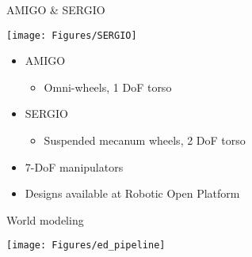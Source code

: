 \documentclass[a4paper,12pt]{article}
\newcommand{\emptylogo}{\texttt{[image: Figures/Empty]}}
\begin{document}
\begin{slidetop}
\begin{multicols}{2}
\begin{bclogo}[couleur = white, arrondi = 0.25, couleurBord = tuedarkblue, epBarre = 0, logo=\emptylogo]{\textcolor{tuedarkblue}{AMIGO \& SERGIO}}
\begin{minipage}[T]{0.48\linewidth}
    \begin{center}
    	\texttt{[image: Figures/SERGIO]}
    \end{center}
\end{minipage}
    \begin{itemize}[itemsep = 0pt, parsep = 0pt, leftmargin=15pt]
    	\item AMIGO
    	\begin{itemize}[itemsep = 0pt, parsep = 0pt, leftmargin=15pt]
    		\item Omni-wheels, 1 DoF torso
    	\end{itemize}
    	\item SERGIO
    	\begin{itemize}[itemsep = 0pt, parsep = 0pt, leftmargin=15pt]
    		\item Suspended mecanum wheels, 2 DoF torso
    	\end{itemize}
        \item 7-DoF manipulators
        \item Designs available at Robotic Open Platform
    \end{itemize}
\end{bclogo}
\vspace{0.2cm}
\begin{bclogo}[couleur = white, arrondi = 0.25, couleurBord = tuedarkblue, epBarre = 0, logo=\emptylogo]{\textcolor{tuedarkblue}{World modeling}}
\bigskip
\begin{center}
	\texttt{[image: Figures/ed\_pipeline]}
\end{center}
\begin{itemize}[itemsep = 0pt, parsep = 0pt, leftmargin=15pt]

\end{itemize}
\end{bclogo}
\end{multicols}
\end{slidetop}
\end{document}
